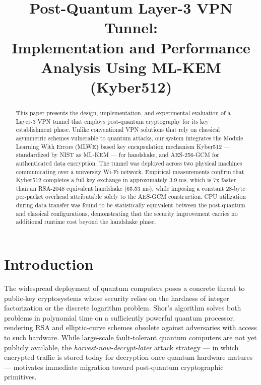 \documentclass[conference]{IEEEtran}
\title{Post-Quantum Layer-3 VPN Tunnel:\\
Implementation and Performance Analysis Using ML-KEM (Kyber512)}
\author{
\IEEEauthorblockN{Mustafa Aydın}
\IEEEauthorblockA{Computer Engineering\\
Marmara University\\
Istanbul, Turkey}
\and
\IEEEauthorblockN{Alperen [Surname]}
\IEEEauthorblockA{Computer Engineering\\
Marmara University\\
Istanbul, Turkey}
}
\begin{document}
\maketitle

\begin{abstract}
This paper presents the design, implementation, and experimental evaluation of a Layer-3 VPN tunnel that employs post-quantum cryptography for its key establishment phase. Unlike conventional VPN solutions that rely on classical asymmetric schemes vulnerable to quantum attacks, our system integrates the Module Learning With Errors (MLWE) based key encapsulation mechanism Kyber512 — standardized by NIST as ML-KEM — for handshake, and AES-256-GCM for authenticated data encryption. The tunnel was deployed across two physical machines communicating over a university Wi-Fi network. Empirical measurements confirm that Kyber512 completes a full key exchange in approximately 3.9 ms, which is 7x faster than an RSA-2048 equivalent handshake (65.53 ms), while imposing a constant 28-byte per-packet overhead attributable solely to the AES-GCM construction. CPU utilization during data transfer was found to be statistically equivalent between the post-quantum and classical configurations, demonstrating that the security improvement carries no additional runtime cost beyond the handshake phase.
\end{abstract}

\section{Introduction}

The widespread deployment of quantum computers poses a concrete threat to public-key cryptosystems whose security relies on the hardness of integer factorization or the discrete logarithm problem. Shor's algorithm solves both problems in polynomial time on a sufficiently powerful quantum processor, rendering RSA and elliptic-curve schemes obsolete against adversaries with access to such hardware. While large-scale fault-tolerant quantum computers are not yet publicly available, the \textit{harvest-now-decrypt-later} attack strategy — in which encrypted traffic is stored today for decryption once quantum hardware matures — motivates immediate migration toward post-quantum cryptographic primitives.
\end{document}
